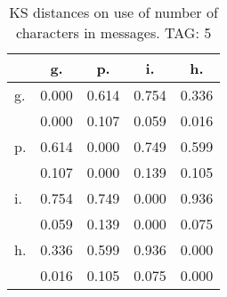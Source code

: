 \begin{table}[h!]
\begin{center}
\begin{tabular}{| l | c | c | c | c |}\hline
 & g. & p. & i. & h. \\\hline
g. & 0.000  & 0.614  & 0.754  & 0.336 \\\hline
 & 0.000  & 0.107  & 0.059  & 0.016 \\\hline
p. & 0.614  & 0.000  & 0.749  & 0.599 \\\hline
 & 0.107  & 0.000  & 0.139  & 0.105 \\\hline
i. & 0.754  & 0.749  & 0.000  & 0.936 \\\hline
 & 0.059  & 0.139  & 0.000  & 0.075 \\\hline
h. & 0.336  & 0.599  & 0.936  & 0.000 \\\hline
 & 0.016  & 0.105  & 0.075  & 0.000 \\\hline
\end{tabular}
\caption{KS distances on use of number of characters in messages. TAG: 5}
\end{center}
\end{table}